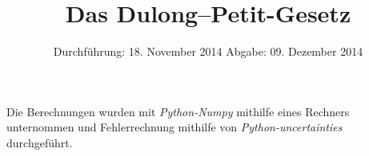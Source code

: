 
\subject{Anfängerpraktikum V201}
\title{Das Dulong--Petit-Gesetz}
\date{
  Durchführung: 18. November 2014
  \hspace{1em}
  Abgabe: 09. Dezember 2014
}


\maketitle
\thispagestyle{empty}
\newpage





\nocite{V201}
\printbibliography
Die Berechnungen wurden mit \textit{Python-Numpy}\cite{numpy} mithilfe eines Rechners unternommen 
und Fehlerrechnung mithilfe von \textit{Python-uncertainties}\cite{uncertainties} durchgeführt.

